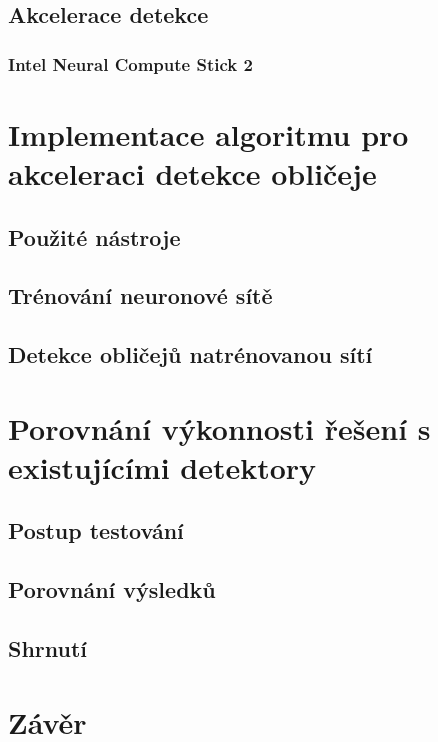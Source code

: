 \section{Akcelerace detekce}
\label{sekce:akcelerace}

\subsection*{Intel Neural Compute Stick 2}






\chapter{Implementace algoritmu pro akceleraci detekce obličeje}
\label{kapitola:implementace}


\section{Použité nástroje}


\section{Trénování neuronové sítě}


\section{Detekce obličejů natrénovanou sítí}




\chapter{Porovnání výkonnosti řešení s existujícími detektory}
\label{kapitola:porovnani_vykonnosti}


\section{Postup testování}


\section{Porovnání výsledků}


\section{Shrnutí}


\chapter{Závěr}
\label{kapitola:zaver}
